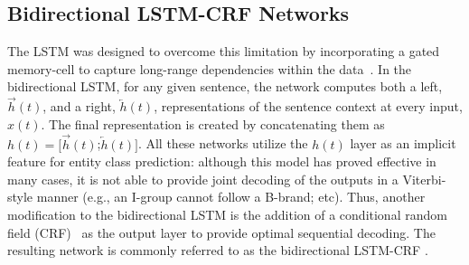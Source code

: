 \documentclass[11pt]{article}
\begin{document}



\subsection{Bidirectional LSTM-CRF Networks}

The LSTM was designed to overcome this limitation by incorporating a gated memory-cell to capture long-range dependencies within the data~\cite{hochreiter1997long}. In the bidirectional LSTM, for any given sentence, the network computes both a left, $\overrightarrow{h}(t)$, and a right, $\overleftarrow{ h}(t)$, representations of the sentence context at every input, $x(t)$. The final representation is created by concatenating them as $h(t) = [\overrightarrow{h}(t)$;$\overleftarrow{ h}(t)]$. All these networks utilize the $h(t)$ layer as an implicit feature for entity class prediction: although this model has proved effective in many cases, it is not able to provide joint decoding of the outputs in a Viterbi-style manner (e.g., an I-group cannot follow a B-brand; etc). Thus, another modification to the bidirectional LSTM is the addition of a conditional random field (CRF)~\cite{lafferty2001conditional} as the output layer to provide optimal sequential decoding. The resulting network is commonly referred to as the bidirectional LSTM-CRF \cite{lample2016neural}.
\end{document}
